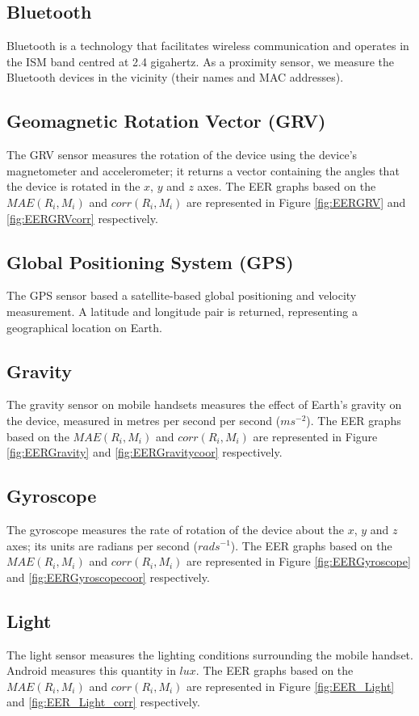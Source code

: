 \documentclass{article}
\begin{document}
\subsection{Bluetooth}
Bluetooth is a technology that facilitates wireless communication and operates in the ISM band centred at 2.4 gigahertz.  As a proximity sensor, we measure the Bluetooth devices in the vicinity (their names and MAC addresses).


\subsection{Geomagnetic Rotation Vector (GRV)}
The GRV sensor measures the rotation of the device using the device's magnetometer and accelerometer; it returns a vector containing the angles that the device is rotated in the $x$, $y$ and $z$ axes. The EER graphs based on the $MAE(R_i, M_i)$ and $corr(R_i, M_i)$ are represented in Figure \ref{fig:EERGRV} and \ref{fig:EERGRVcorr} respectively.

\subsection{Global Positioning System (GPS)}
The GPS sensor based a satellite-based global positioning and velocity measurement. A latitude and longitude pair is returned, representing a geographical location on Earth.


\subsection{Gravity}
The gravity sensor on mobile handsets measures the effect of Earth's gravity on the device, measured in metres per second per second ($ms^{-2}$). The EER graphs based on the $MAE(R_i, M_i)$ and $corr(R_i, M_i)$ are represented in Figure \ref{fig:EERGravity} and \ref{fig:EERGravitycoor} respectively.

\subsection{Gyroscope}
The gyroscope measures the rate of rotation of the device about the $x$, $y$ and $z$ axes; its units are radians per second ($rads^{-1}$).  The EER graphs based on the $MAE(R_i, M_i)$ and $corr(R_i, M_i)$ are represented in Figure \ref{fig:EERGyroscope} and \ref{fig:EERGyroscopecoor} respectively.

\subsection{Light}
The light sensor measures the lighting conditions surrounding the mobile handset.  Android measures this quantity in $lux$.  The EER graphs based on the $MAE(R_i, M_i)$ and $corr(R_i, M_i)$ are represented in Figure \ref{fig:EER_Light} and \ref{fig:EER_Light_corr} respectively.
\end{document}
